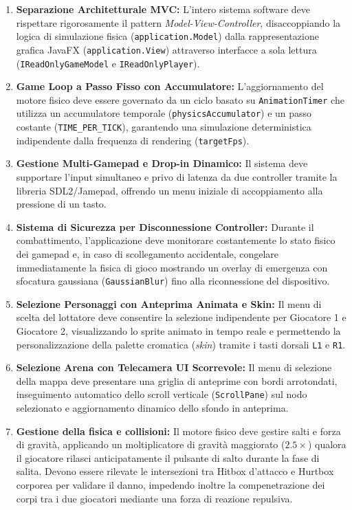 \documentclass[11pt, a4paper]{article}
\begin{document}
\begin{enumerate}
    \item \textbf{Separazione Architetturale MVC:} L'intero sistema software deve rispettare rigorosamente il pattern \emph{Model-View-Controller}, disaccoppiando la logica di simulazione fisica (\texttt{application.Model}) dalla rappresentazione grafica JavaFX (\texttt{application.View}) attraverso interfacce a sola lettura (\texttt{IReadOnlyGameModel} e \texttt{IReadOnlyPlayer}).
    \item \textbf{Game Loop a Passo Fisso con Accumulatore:} L'aggiornamento del motore fisico deve essere governato da un ciclo basato su \texttt{AnimationTimer} che utilizza un accumulatore temporale (\texttt{physicsAccumulator}) e un passo costante (\texttt{TIME\_PER\_TICK}), garantendo una simulazione deterministica indipendente dalla frequenza di rendering (\texttt{targetFps}).
    \item \textbf{Gestione Multi-Gamepad e Drop-in Dinamico:} Il sistema deve supportare l'input simultaneo e privo di latenza da due controller tramite la libreria SDL2/Jamepad, offrendo un menu iniziale di accoppiamento alla pressione di un tasto.
    \item \textbf{Sistema di Sicurezza per Disconnessione Controller:} Durante il combattimento, l'applicazione deve monitorare costantemente lo stato fisico dei gamepad e, in caso di scollegamento accidentale, congelare immediatamente la fisica di gioco mostrando un overlay di emergenza con sfocatura gaussiana (\texttt{GaussianBlur}) fino alla riconnessione del dispositivo.
    \item \textbf{Selezione Personaggi con Anteprima Animata e Skin:} Il menu di scelta del lottatore deve consentire la selezione indipendente per Giocatore 1 e Giocatore 2, visualizzando lo sprite animato in tempo reale e permettendo la personalizzazione della palette cromatica (\emph{skin}) tramite i tasti dorsali \texttt{L1} e \texttt{R1}.
    \item \textbf{Selezione Arena con Telecamera UI Scorrevole:} Il menu di selezione della mappa deve presentare una griglia di anteprime con bordi arrotondati, inseguimento automatico dello scroll verticale (\texttt{ScrollPane}) sul nodo selezionato e aggiornamento dinamico dello sfondo in anteprima.
    \item \textbf{Gestione della fisica e collisioni:} Il motore fisico deve gestire salti e forza di gravità, applicando un moltiplicatore di gravità maggiorato ($2.5\times$) qualora il giocatore rilasci anticipatamente il pulsante di salto durante la fase di salita. Devono essere rilevate le intersezioni tra Hitbox d'attacco e Hurtbox corporea per validare il danno, impedendo inoltre la compenetrazione dei corpi tra i due giocatori mediante una forza di reazione repulsiva.

\end{enumerate}
\end{document}
